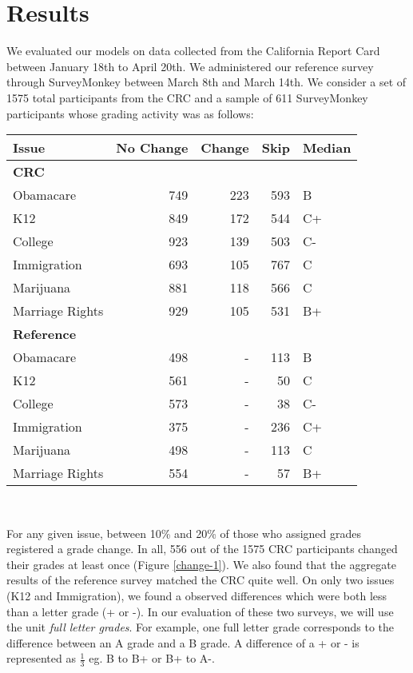 \section{Results}
We evaluated our models on data collected from the California Report Card between January 18th to April 20th.
We administered our reference survey through SurveyMonkey between March 8th and March 14th.
We consider a set of 1575 total participants from the CRC and a sample of 611 SurveyMonkey participants whose grading activity was as follows:\\[1\baselineskip]

{\centering\scriptsize
\begin{tabular}[!ht]{ l | r | r | r | l }
Issue & No Change & Change & Skip & Median \\
\hline
\hline
  \multicolumn{5}{l}{\textbf{CRC}}\\
  \hline
  Obamacare & 749 & 223 & 593 & B \\
  \hline
  K12 & 849 & 172 & 544 & C+ \\
  \hline
  College & 923 & 139 & 503 & C-\\
  \hline
  Immigration & 693 & 105 & 767 & C \\
  \hline
  Marijuana & 881 & 118 & 566 & C \\
  \hline
  Marriage Rights & 929 & 105 & 531 & B+\\
\hline
\hline
\multicolumn{5}{l}{\textbf{Reference}}\\
\hline
  Obamacare & 498 & - & 113 & B \\
  \hline
  K12 & 561 & - & 50 & C \\
  \hline
  College & 573 & - & 38 & C-\\
  \hline
  Immigration & 375 & - & 236 & C+ \\
  \hline
  Marijuana & 498 & - & 113 & C \\
  \hline
  Marriage Rights & 554 & - & 57 & B+
\end{tabular}\\[1\baselineskip]
}

For any given issue, between 10\% and 20\% of those who assigned grades registered a grade change.
In all, 556 out of the 1575 CRC participants changed their grades at least once (Figure \ref{change-1}).
We also found that the aggregate results of the reference survey matched the CRC quite well.
On only two issues (K12 and Immigration), we found a observed differences which were both less than a letter grade (+ or -).
In our evaluation of these two surveys, we will use the unit \emph{full letter grades}.
For example, one full letter grade corresponds to the difference between an A grade and a B grade. 
A difference of a + or - is represented as $\frac{1}{3}$ eg. B to B+ or B+ to A-. 

